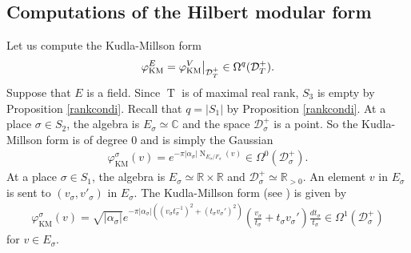 \documentclass[11pt]{article} %
\newcommand{\8}{\infty}
\newcommand{\Tbf}{\operatorname{T}}
\newcommand{\KM}{\operatorname{KM}}
\newcommand{\D}{\mathcal{D}}
\newcommand{\R}{\mathbb{R}}
\newcommand{\C}{\mathbb{C}}
\newcommand{\N}{\operatorname{N}}
\newcommand\restr[2]{{%
  \left.\kern-\nulldelimiterspace %
  #1 %
  \vphantom{\big|} %
  \right|_{#2} %
  }}
\theoremstyle{mytheoremstyle}
\theoremstyle{remark}
\numberwithin{equation}{section}
\begin{document}
\subsection{Computations of the Hilbert modular form} \label{specialcases}
Let us compute the Kudla-Millson form
\begin{align}
    \varphi^E_{\KM}=\restr{\varphi^V_{\KM}}{\D^+_T} \in \Omega^{q}(\D^+_T).
\end{align}
Suppose that $E$ is a field. Since $\Tbf$ is of maximal real rank, $S_3$ is empty by Proposition \ref{rankcondi}. Recall that $q=\vert S_1 \vert$ by Proposition \ref{rankcondi}.  At a place $\sigma \in S_2$, the algebra is $E_\sigma \simeq \C$ and the space $\D_\sigma^+$ is a point. So the Kudla-Millson form is of degree $0$ and is simply the Gaussian
\begin{align}
    \varphi_{\KM}^\sigma(v)=e^{-\pi \vert \alpha_\sigma \vert \N_{E_\sigma/F_\sigma}(v)} \in \Omega^{0}(\D_\sigma^{+}).
\end{align}
At a place $\sigma \in S_1$, the algebra is $E_\sigma \simeq \R \times \R$ and $\D_\sigma^+ \simeq \R_{>0}$. An element $v$ in $E_\sigma$ is sent to $(v_\sigma,v'_\sigma)$ in $E_\sigma$. The Kudla-Millson form (see \cite{rbrkmmq}) is given by
\begin{align}
    \varphi^\sigma_{\KM}(v)= \sqrt{\vert \alpha_\sigma \vert} e^{-\pi \vert \alpha_\sigma \vert \left ( (v_\sigma t_\sigma ^{-1})^2+(t_\sigma v_\sigma')^2\right )} \left ( \frac{v_\sigma}{t_\sigma}+t_\sigma v_\sigma' \right ) \frac{dt_\sigma}{t_\sigma} \in \Omega^{1}(\D_\sigma^{+})
\end{align}
for $v \in E_\sigma$.
\end{document}
